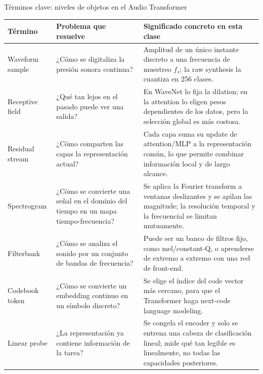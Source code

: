 \documentclass[a4paper]{article}
\begin{document}
\begin{knowledgebox}{Términos clave: niveles de objetos en el Audio Transformer}
\small
\begin{tabularx}{\textwidth}{L{0.20\textwidth}L{0.27\textwidth}X}
\toprule
Término & Problema que resuelve & Significado concreto en esta clase \\
\midrule
Waveform sample & ¿Cómo se digitaliza la presión sonora continua? & Amplitud de un único instante discreto a una frecuencia de muestreo $f_s$; la raw synthesis la cuantiza en 256 clases. \\
Receptive field & ¿Qué tan lejos en el pasado puede ver una salida? & En WaveNet lo fija la dilation; en la attention lo eligen pesos dependientes de los datos, pero la selección global es más costosa. \\
Residual stream & ¿Cómo comparten las capas la representación actual? & Cada capa suma su update de attention/MLP a la representación común, lo que permite combinar información local y de largo alcance. \\
Spectrogram & ¿Cómo se convierte una señal en el dominio del tiempo en un mapa tiempo-frecuencia? & Se aplica la Fourier transform a ventanas deslizantes y se apilan las magnitude; la resolución temporal y la frecuencial se limitan mutuamente. \\
Filterbank & ¿Cómo se analiza el sonido por un conjunto de bandas de frecuencia? & Puede ser un banco de filtros fijo, como mel/constant-Q, o aprenderse de extremo a extremo con una red de front-end. \\
Codebook token & ¿Cómo se convierte un embedding continuo en un símbolo discreto? & Se elige el índice del code vector más cercano, para que el Transformer haga next-code language modeling. \\
Linear probe & ¿La representación ya contiene información de la tarea? & Se congela el encoder y solo se entrena una cabeza de clasificación lineal; mide qué tan legible es linealmente, no todas las capacidades posteriores. \\
\bottomrule
\end{tabularx}
\end{knowledgebox}

\end{document}
